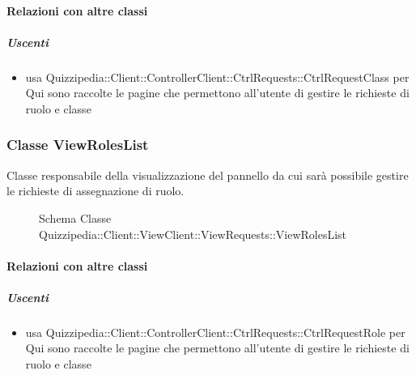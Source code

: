 \paragraph{Relazioni con altre classi}
\subparagraph{Uscenti}
\begin{itemize}
\item usa Quizzipedia::Client::ControllerClient::CtrlRequests::CtrlRequestClass per Qui sono raccolte le pagine che permettono all'utente di gestire le richieste di ruolo e classe
\end{itemize}
\subsubsection{Classe ViewRolesList}
Classe responsabile della visualizzazione del pannello da cui sarà possibile gestire le richieste di assegnazione di ruolo.
\begin{figure}[H]
\centering
\noindent{}
\caption[Schema Classe ViewRolesList]{Schema Classe Quizzipedia::Client::ViewClient::ViewRequests::ViewRolesList}
\end{figure}
\paragraph{Relazioni con altre classi}
\subparagraph{Uscenti}
\begin{itemize}
\item usa Quizzipedia::Client::ControllerClient::CtrlRequests::CtrlRequestRole per Qui sono raccolte le pagine che permettono all'utente di gestire le richieste di ruolo e classe
\end{itemize}
